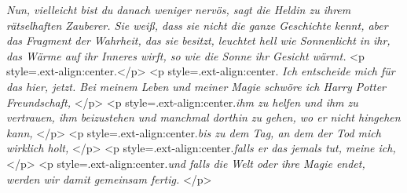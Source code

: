 \emph{\glqq{}Nun, vielleicht bist du danach weniger nervös\grqq{}, sagt die
Heldin zu ihrem rätselhaften Zauberer. Sie weiß, dass sie nicht die ganze
Geschichte kennt, aber das Fragment der Wahrheit, das sie besitzt, leuchtet hell
wie Sonnenlicht in ihr, das Wärme auf ihr Inneres wirft, so wie die Sonne ihr
Gesicht wärmt.} <p style=\grqq{}.ext-align:center\grqq{}.</p> <p
style=\grqq{}.ext-align:center\grqq{}.\emph{ \glqq{}Ich entscheide mich für das
hier, jetzt. Bei meinem Leben und meiner Magie schwöre ich Harry Potter
Freundschaft,} </p> <p style=\grqq{}.ext-align:center\grqq{}.\emph{ihm zu helfen
und ihm zu vertrauen, ihm beizustehen und manchmal dorthin zu gehen, wo er nicht
hingehen kann,} </p> <p style=\grqq{}.ext-align:center\grqq{}.\emph{bis zu dem
Tag, an dem der Tod mich wirklich holt,} </p> <p
style=\grqq{}.ext-align:center\grqq{}.\emph{falls er das jemals tut, meine ich,
}</p> <p style=\grqq{}.ext-align:center\grqq{}.\emph{und falls die Welt oder
ihre Magie endet, werden wir damit gemeinsam fertig.\grqq{}} </p>

